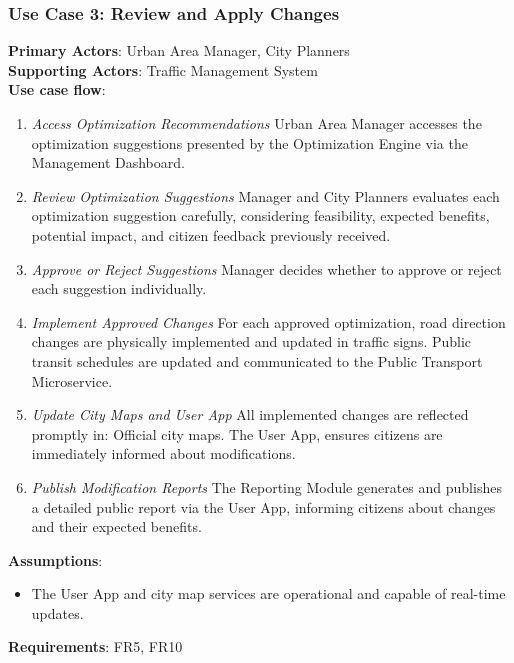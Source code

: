 \documentclass[a4paper,12pt]{article}
\begin{document}
\subsubsection*{Use Case 3: Review and Apply Changes}
\textbf{Primary Actors}: Urban Area Manager, City Planners \\
\textbf{Supporting Actors}: Traffic Management System \\ 
\textbf{Use case flow}: 
\begin{enumerate}
    \item \textit{Access Optimization Recommendations} Urban Area Manager accesses the optimization suggestions presented by the Optimization Engine via the Management Dashboard.
    \item \textit{Review Optimization Suggestions} Manager and City Planners evaluates each optimization suggestion carefully, considering feasibility, expected benefits, potential impact, and citizen feedback previously received.
    \item \textit{Approve or Reject Suggestions} Manager decides whether to approve or reject each suggestion individually.
    \item \textit{Implement Approved Changes} For each approved optimization, road direction changes are physically implemented and updated in traffic signs.
    Public transit schedules are updated and communicated to the Public Transport Microservice.
    \item \textit{Update City Maps and User App} All implemented changes are reflected promptly in: Official city maps.
    The User App, ensures citizens are immediately informed about modifications.
    \item \textit{Publish Modification Reports} The Reporting Module generates and publishes a detailed public report via the User App, informing citizens about changes and their expected benefits.
\end{enumerate}
\textbf{Assumptions}: 
\begin{itemize}
    \item The User App and city map services are operational and capable of real-time updates.
\end{itemize}
\textbf{Requirements}: FR5, FR10
\\
\newpage
\end{document}
